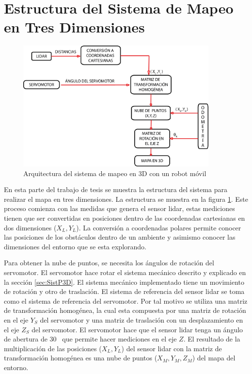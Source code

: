 \section{Estructura del Sistema de Mapeo en Tres Dimensiones}

\begin{figure}%
	\centering \footnotesize
	\includegraphics[width=0.9\textwidth]{images/estructura_3d.png}
	\captionsetup{font=footnotesize}
	\caption{Arquitectura del sistema de mapeo en 3D con un robot móvil}
	\label{fig:Sist3D}
\end{figure}

En esta parte del trabajo de tesis se muestra la estructura del sistema para realizar el
mapa en tres dimensiones. La estructura se muestra en la figura \ref{fig:Sist3D}. Este 
proceso comienza con las medidas que genera el sensor lidar, estas mediciones tienen
que ser convertidas en posiciones dentro de las coordenadas cartesianas en dos dimensiones
($X_{L}, Y_{L}$). La conversión a coordenadas polares permite conocer las posiciones de los 
obstáculos dentro de un ambiente y asimismo conocer las dimensiones del entorno que se esta 
explorando.

Para obtener la nube de puntos, se necesita los ángulos de rotación del servomotor. El 
servomotor hace rotar el sistema mecánico descrito y explicado en la sección 
\ref{sec:SistP3D}. El sistema mecánico implementado tiene un movimiento de rotación y otro 
de traslación. El sistema de referencia del sensor lidar se toma como el 
sistema de referencia del servomotor. Por tal motivo se utiliza una matriz de transformación 
homogénea, la cual esta compuesta por una matriz de rotación en el eje $Y_{S}$ del servomotor 
y una matriz de traslación con un desplazamiento en el eje $Z_{S}$ del servomotor. El
servomotor hace que el sensor lidar tenga un ángulo de abertura de 30\grad~ que permite
hacer mediciones en el eje $Z$. El resultado de la multiplicación de las posiciones 
($X_{L}, Y_{L}$) del sensor lidar con la matriz de transformación homogénea es
una nube de puntos ($X_{M}, Y_{M}, Z_{M}$) del mapa del entorno.

